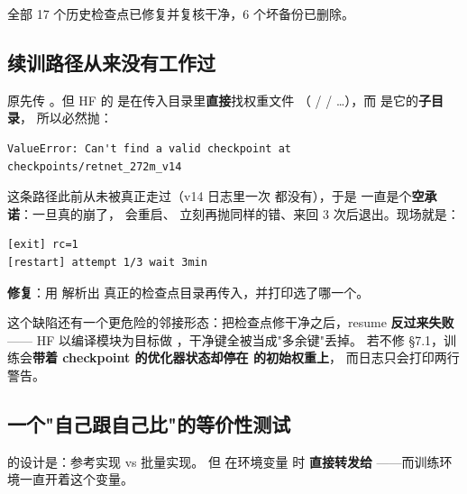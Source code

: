 \documentclass[11pt,openany]{ctexart}
\begin{document}
全部 17 个历史检查点已修复并复核干净，6 个坏备份已删除。

\subsection{续训路径从来没有工作过}

 原先传 。但 HF 的  是在传入目录里\textbf{直接}找权重文件 （ /  / …），而  是它的\textbf{子目录}， 所以必然抛：

\begin{lstlisting}[]
ValueError: Can't find a valid checkpoint at checkpoints/retnet_272m_v14
\end{lstlisting}

这条路径此前从未被真正走过（v14 日志里一次 \code{[restart]} 都没有），于是  一直是个\textbf{空承诺}：一旦真的崩了， 会重启、 立刻再抛同样的错、来回 3 次后退出。现场就是：

\begin{lstlisting}[]
[exit] rc=1
[restart] attempt 1/3 wait 3min
\end{lstlisting}

\textbf{修复}：用  解析出 真正的检查点目录再传入，并打印选了哪一个。

\begin{notebox}
这个缺陷还有一个更危险的邻接形态：把检查点修干净之后，resume \textbf{反过来失败}—— HF 以编译模块为目标做 ，干净键全被当成"多余键"丢掉。 若不修 §7.1，训练会\textbf{带着 checkpoint 的优化器状态却停在  的初始权重上}， 而日志只会打印两行  警告。
\end{notebox}

\subsection{一个"自己跟自己比"的等价性测试}

 的设计是：参考实现 vs 批量实现。 但  在环境变量  时 \textbf{直接转发给 }——而训练环境一直开着这个变量。
\end{document}
